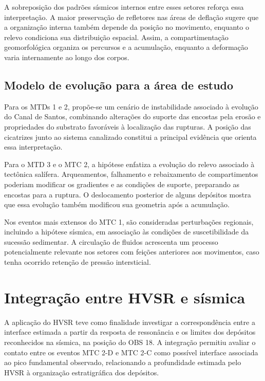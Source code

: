 A sobreposição dos padrões sísmicos internos entre esses setores reforça essa interpretação. A maior preservação de refletores nas áreas de deflação sugere que a organização interna também depende da posição no movimento, enquanto o relevo condiciona sua distribuição espacial. Assim, a compartimentação geomorfológica organiza os percursos e a acumulação, enquanto a deformação varia internamente ao longo dos corpos.

\subsection{Modelo de evolução para a área de estudo}\label{sec:6-7-5}

Para os MTDs 1 e 2, propõe-se um cenário de instabilidade associado à evolução do Canal de Santos, combinando alterações do suporte das encostas pela erosão e propriedades do substrato favoráveis à localização das rupturas. A posição das cicatrizes junto ao sistema canalizado constitui a principal evidência que orienta essa interpretação.

Para o MTD 3 e o MTC 2, a hipótese enfatiza a evolução do relevo associado à tectônica salífera. Arqueamentos, falhamento e rebaixamento de compartimentos poderiam modificar os gradientes e as condições de suporte, preparando as encostas para a ruptura. O deslocamento posterior de alguns depósitos mostra que essa evolução também modificou sua geometria após a acumulação.

Nos eventos mais extensos do MTC 1, são consideradas perturbações regionais, incluindo a hipótese sísmica, em associação às condições de suscetibilidade da sucessão sedimentar. A circulação de fluidos acrescenta um processo potencialmente relevante nos setores com feições anteriores aos movimentos, caso tenha ocorrido retenção de pressão intersticial.

\section{Integração entre HVSR e sísmica}\label{sec:6-8}

A aplicação do HVSR teve como finalidade investigar a correspondência entre a interface estimada a partir da resposta de ressonância e os limites dos depósitos reconhecidos na sísmica, na posição do OBS 18. A integração permitiu avaliar o contato entre os eventos MTC 2-D e MTC 2-C como possível interface associada ao pico fundamental observado, relacionando a profundidade estimada pelo HVSR à organização estratigráfica dos depósitos.

